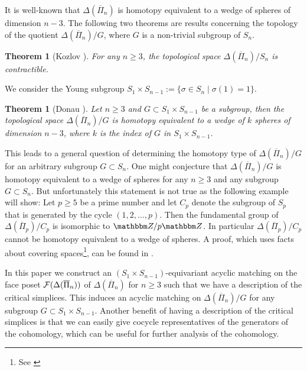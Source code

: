 \documentclass{elsarticle}
\newtheorem{thm}[df]{Theorem}
\def\Z{\mathbbm Z}
\begin{document}
It is well-known that $\Delta(\overline{\Pi}_n)$ is homotopy equivalent to a wedge of spheres of dimension $n-3$. The following two theorems are results concerning the topology of the quotient $\Delta(\overline{\Pi}_n)/G$, where $G$ is a non-trivial subgroup of $S_n$.
\begin{thm}[Kozlov \cite{clmap}]
For any $n\geq 3$, the topological space $\Delta(\overline{\Pi}_n)/S_n$ is contractible.
\end{thm}
We consider the Young subgroup $S_1\times S_{n-1}:=\{\sigma\in S_n\mid\sigma(1)=1\}$.
\begin{thm}[Donau \cite{donau}]
\label{rdthm}
Let $n\geq3$ and $G\subset S_1\times S_{n-1}$ be a subgroup, then the topological space $\Delta(\overline{\Pi}_n)/G$ is homotopy equivalent to a wedge of $k$ spheres of dimension $n-3$, where $k$ is the index of $G$ in $S_1\times S_{n-1}$.
\end{thm}
This leads to a general question of determining the homotopy type of $\Delta(\overline{\Pi}_n)/G$ for an arbitrary subgroup $G\subset S_n$. One might conjecture that $\Delta(\overline{\Pi}_n)/G$ is homotopy equivalent to a wedge of spheres for any $n\geq 3$ and any subgroup $G\subset S_n$. But unfortunately this statement is not true as the following example will show: Let $p\geq 5$ be a prime number and let $C_p$ denote the subgroup of $S_p$ that is generated by the cycle $(1,2,\dots,p)$. Then the fundamental group of $\Delta(\overline{\Pi}_p)/C_p$ is isomorphic to $\Z/p\Z$. In particular $\Delta(\overline{\Pi}_p)/C_p$ cannot be homotopy equivalent to a wedge of spheres. A proof, which uses facts about covering spaces\footnote{See \cite[Chapter 1.3]{hatcher}}, can be found in \cite{torsion}.


In this paper we construct an $(S_1\times S_{n-1})$-equivariant acyclic matching on the face poset ${\cal F}(\Delta(\overline{\Pi}_n))$ of $\Delta(\overline{\Pi}_n)$ for $n\geq 3$ such that we have a description of the critical simplices. This induces an acyclic matching on $\Delta(\overline{\Pi}_n)/G$ for any subgroup $G\subset S_1\times S_{n-1}$. Another benefit of having a description of the critical simplices is that we can easily give cocycle representatives of the generators of the cohomology, which can be useful for further analysis of the cohomology.
\end{document}
